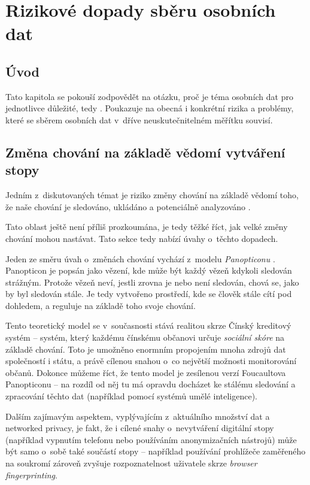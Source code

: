 \chapter{Rizikové dopady sběru osobních dat}

\section*{Úvod}
Tato kapitola se pokouší zodpovědět na otázku, proč je téma osobních dat pro jednotlivce důležité, tedy . Poukazuje na obecná i konkrétní rizika a problémy, které se sběrem osobních dat v~dříve neuskutečnitelném měřítku souvisí. 


\section{Změna chování na základě vědomí vytváření stopy}

Jedním z~diskutovaných témat je riziko změny chování na základě vědomí toho, že naše chování je sledováno, ukládáno a potenciálně analyzováno \citep{behavior-changes}.

Tato oblast ještě není příliš prozkoumána, je tedy těžké říct, jak velké změny chování mohou nastávat. Tato sekce tedy nabízí úvahy o~těchto dopadech.

Jeden ze směru úvah o~změnách chování vychází z~modelu \textit{Panopticonu} \citep{panopticon}. Panopticon je popsán jako vězení, kde může být každý vězeň kdykoli sledován strážným. Protože vězeň neví, jestli zrovna je nebo není sledován, chová se, jako by byl sledován stále. Je tedy vytvořeno prostředí, kde se člověk stále cítí pod dohledem, a reguluje na základě toho svoje chování.

Tento teoretický model se v~současnosti stává realitou skrze Čínský kreditový systém -- systém, který každému čínskému občanovi určuje \textit{sociální skóre} na základě chování. Toto je umožněno enormním propojením mnoha zdrojů dat společností i státu, a právě cílenou snahou o~co největší možnosti monitorování občanů. Dokonce můžeme říct, že tento model je zesílenou verzí Foucaultova Panopticonu -- na rozdíl od něj tu má opravdu docházet ke stálému sledování a zpracování těchto dat (například pomocí systémů umělé inteligence).

Dalším zajímavým aspektem, vyplývajícím z~aktuálního množství dat a networked privacy, je fakt, že i cílené snahy o~nevytváření digitální stopy (například vypnutím telefonu nebo používáním anonymizačních nástrojů) může být samo o~sobě také součástí stopy -- například používání prohlížeče zaměřeného na soukromí zároveň zvyšuje rozpoznatelnost uživatele skrze \textit{browser fingerprinting}.

